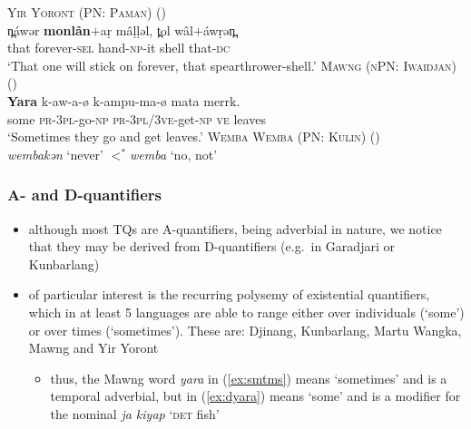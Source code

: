 \documentclass{article}
\begin{document}
\begin{exe}
  \ex\label{ex:4eva} \textsc{Yir Yoront (PN: Paman)} (\citealt[343]{alpher73})\\
  \gll n̪\'awər \textbf{monlån}$+$a\d{r} m\^a\d{l}\d{l}əl, t̪ol w\^al$+$\'aw\d{r}ən̪.\\
  that forever-\textsc{sel} hand-\textsc{np}-it shell that-\textsc{dc}\\
  \glt `That one will stick on forever, that spearthrower-shell.'
  \ex\label{ex:smtms} \textsc{Mawng (nPN: Iwaidjan)} (\citealt{ngaralk})\\
  \gll \textbf{Yara} k-aw-a-ø k-ampu-ma-ø mata merrk.\\
  some \textsc{pr-3pl}-go-\textsc{np} \textsc{pr-3pl/3ve}-get-\textsc{np} \textsc{ve} leaves\\
  \glt `Sometimes they go and get leaves.' %
  \ex\label{ex:never} \textsc{Wemba Wemba (PN: Kulin)} (\citealt[47]{hercus92})\\
  \textit{\charis wembakən} `never' $<^*$\textit{wemba} `no, not'
\end{exe}

\subsubsection{A- and D-quantifiers}
\label{sec:adqfrs}
\begin{itemize}
\item although most TQs are A-quantifiers, being adverbial in nature, we notice that they may be derived from D-quantifiers (e.g.\ in Garadjari or Kunbarlang)
\item of particular interest is the recurring polysemy of existential quantifiers, which in at least 5 languages are able to range either over individuals (`some') or over times (`sometimes'). These are: Djinang, Kunbarlang, Martu Wangka, Mawng and Yir Yoront
  \begin{itemize}
  \item thus, the Mawng word \textit{yara} in (\ref{ex:smtms}) means `sometimes' and is a temporal adverbial, but in (\ref{ex:dyara}) means `some' and is a modifier for the nominal \textit{ja kiyap} `\textsc{det} fish'
  \end{itemize}
\end{itemize}
\end{document}
